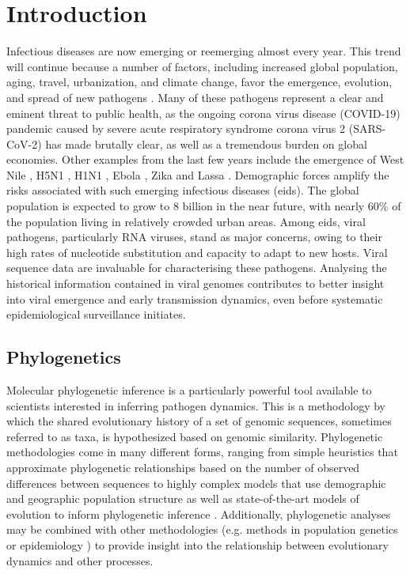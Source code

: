 \chapter{Introduction}\label{ch:introduction}


Infectious diseases are now emerging or reemerging almost every year.
This trend will continue because a number of factors, including increased global population, aging, travel, urbanization, and climate change, favor the emergence, evolution, and spread of new pathogens \cite{bloom2017emerging}.
Many of these pathogens represent a clear and eminent threat to public health, as the ongoing corona virus disease (COVID-19) pandemic caused by severe acute respiratory syndrome corona virus 2 (SARS-CoV-2) has made brutally clear, as well as a tremendous burden on global economies.
Other examples from the last few years include the emergence of West Nile \cite{hadfield2019twenty}, H5N1 \cite{imai2018diversity}, H1N1 \cite{bedford2015global}, Ebola \cite{dudas2017virus}, Zika \cite{fauci2016zika, faria2016zika} and Lassa \cite{kafetzopoulou2019metagenomic}.
Demographic forces amplify the risks associated with such emerging infectious diseases (\gls{eids}).
The global population is expected to grow to 8 billion in the near future, with nearly 60\% of the population living in relatively crowded urban areas.
Among \gls{eids}, viral pathogens, particularly RNA viruses, stand as major concerns, owing to their high rates of nucleotide substitution and capacity to adapt to new hosts.
Viral sequence data are invaluable for characterising these pathogens.
Analysing the historical information contained in viral genomes contributes to better insight into viral emergence and early transmission dynamics, even before systematic epidemiological surveillance initiates.

\section{Phylogenetics}

Molecular phylogenetic inference is a particularly powerful tool available to scientists interested in inferring pathogen dynamics.
This is a methodology by which the shared evolutionary history of a set of genomic sequences, sometimes referred to as taxa, is hypothesized based on genomic similarity.
Phylogenetic methodologies come in many different forms, ranging from simple heuristics that approximate phylogenetic relationships based on the number of observed differences between sequences \cite{felsenstein2003inferring} to highly complex models that use demographic and geographic population structure as well as state-of-the-art models of evolution to inform phylogenetic inference \cite{dudas2018mers}.
Additionally, phylogenetic analyses may be combined with other methodologies (e.g. methods in population genetics \cite{felsenstein2003inferring} or epidemiology \cite{black2020ten}) to provide insight into the relationship between evolutionary dynamics and other processes.

